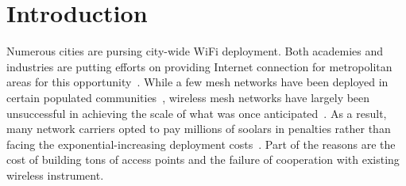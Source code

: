 \section{Introduction}
\label{sec:introduction}


 
Numerous cities are pursing city-wide WiFi deployment.
Both academies and industries are putting efforts on providing 
Internet connection for metropolitan areas for this opportunity~\cite{pahlavan2011principles}.
While a few mesh networks have been deployed in 
certain populated communities~\cite{CRSK06,google_imc08},
wireless mesh networks have largely been unsuccessful in achieving 
the scale of what was once anticipated~\cite{taps}. 
As a result, many network carriers opted to pay millions of soolars 
in penalties rather than facing the exponential-increasing deployment
 costs~\cite{cnet_aug07}.
Part of the reasons are the cost of building tons of access points 
and the failure of cooperation with existing wireless instrument.

